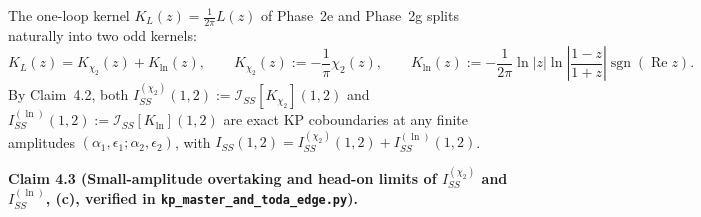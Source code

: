 \documentclass[11pt,a4paper]{article}
\newcommand{\sgn}{\operatorname{sgn}}
\newcommand{\Rea}{\operatorname{Re}}
\begin{document}
The one-loop kernel $K_L(z) = \frac{1}{2\pi}L(z)$ of Phase~2e and Phase~2g splits
naturally into two odd kernels:
\begin{equation}
  K_L(z) = K_{\chi_2}(z) + K_{\ln}(z), \qquad
  K_{\chi_2}(z) := -\frac{1}{\pi}\chi_2(z), \qquad
  K_{\ln}(z) := -\frac{1}{2\pi}\ln|z|\ln\!\left|\frac{1-z}{1+z}\right|\sgn(\Rea z).
  \label{eq:K_split}
\end{equation}
By Claim~4.2, both $I_{SS}^{(\chi_2)}(1,2) := \mathcal{I}_{SS}[K_{\chi_2}](1,2)$
and $I_{SS}^{(\ln)}(1,2) := \mathcal{I}_{SS}[K_{\ln}](1,2)$ are exact KP
coboundaries at any finite amplitudes $(\alpha_1,\epsilon_1;\alpha_2,\epsilon_2)$,
with $I_{SS}(1,2) = I_{SS}^{(\chi_2)}(1,2) + I_{SS}^{(\ln)}(1,2)$.

\medskip\noindent
\textbf{Claim 4.3 (Small-amplitude overtaking and head-on limits of $I_{SS}^{(\chi_2)}$ and $I_{SS}^{(\ln)}$, \textbf{(c)}, verified in \texttt{kp\_master\_and\_toda\_edge.py}).}
\end{document}
